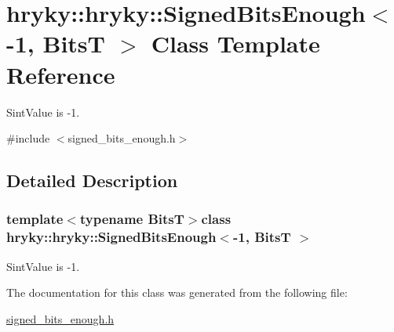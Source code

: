 \hypertarget{classhryky_1_1hryky_1_1_signed_bits_enough_3-1_00_01_bits_t_01_4}{\section{hryky\-:\-:hryky\-:\-:Signed\-Bits\-Enough$<$-\/1, Bits\-T $>$ Class Template Reference}
\label{classhryky_1_1hryky_1_1_signed_bits_enough_3-1_00_01_bits_t_01_4}
}


Sint\-Value is -\/1.  




{\ttfamily \#include $<$signed\-\_\-bits\-\_\-enough.\-h$>$}



\subsection{Detailed Description}
\subsubsection*{template$<$typename Bits\-T$>$class hryky\-::hryky\-::\-Signed\-Bits\-Enough$<$-\/1, Bits\-T $>$}

Sint\-Value is -\/1. 

The documentation for this class was generated from the following file\-:\begin{DoxyCompactItemize}
\item 
\hyperlink{signed__bits__enough_8h}{signed\-\_\-bits\-\_\-enough.\-h}\end{DoxyCompactItemize}
